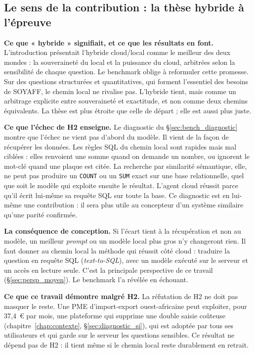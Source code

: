 \subsection{Le sens de la contribution : la thèse hybride à l'épreuve}
\label{sec:disc_sens}

\textbf{Ce que « hybride » signifiait, et ce que les résultats en font.} L'introduction présentait l'hybride cloud/local comme le meilleur des deux mondes : la souveraineté du local et la puissance du cloud, arbitrées selon la sensibilité de chaque question. Le benchmark oblige à reformuler cette promesse. Sur des questions structurées et quantitatives, qui forment l'essentiel des besoins de SOYAFF, le chemin local ne rivalise pas. L'hybride tient, mais comme un arbitrage explicite entre souveraineté et exactitude, et non comme deux chemins équivalents. La thèse est plus étroite que celle de départ ; elle est aussi plus juste.

\textbf{Ce que l'échec de H2 enseigne.} Le diagnostic du §\ref{sec:bench_diagnostic} montre que l'échec ne vient pas d'abord du modèle. Il vient de la façon de récupérer les données. Les règles SQL du chemin local sont rapides mais mal ciblées : elles renvoient une somme quand on demande un nombre, ou ignorent le mot-clé quand une plaque est citée. La recherche par similarité sémantique, elle, ne peut pas produire un \texttt{COUNT} ou un \texttt{SUM} exact sur une base relationnelle, quel que soit le modèle qui exploite ensuite le résultat. L'agent cloud réussit parce qu'il écrit lui-même sa requête SQL sur toute la base. Ce diagnostic est en lui-même une contribution : il sera plus utile au concepteur d'un système similaire qu'une parité confirmée.

\textbf{La conséquence de conception.} Si l'écart tient à la récupération et non au modèle, un meilleur \textit{prompt} ou un modèle local plus gros n'y changeront rien. Il faut donner au chemin local la méthode qui réussit côté cloud : traduire la question en requête SQL (\textit{text-to-SQL}), avec un modèle exécuté sur le serveur et un accès en lecture seule. C'est la principale perspective de ce travail (§\ref{sec:persp_moyen}). Le benchmark l'a révélée en échouant.

\textbf{Ce que ce travail démontre malgré H2.} La réfutation de H2 ne doit pas masquer le reste. Une PME d'import-export ouest-africaine peut exploiter, pour 37,4~€ par mois, une plateforme qui supprime une double saisie coûteuse (chapitre~\ref{chap:contexte}, §\ref{sec:diagnostic_si}), qui est adoptée par tous ses utilisateurs et qui garde sur le serveur les questions sensibles. Ce résultat ne dépend pas de H2 : il tient même si le chemin local reste durablement en retrait.

